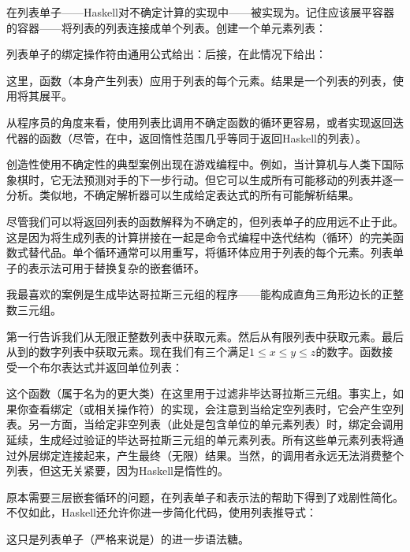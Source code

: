 在列表单子——Haskell对不确定计算的实现中——被实现为。记住应该展平容器的容器——将列表的列表连接成单个列表。创建一个单元素列表：

列表单子的绑定操作符由通用公式给出：后接，在此情况下给出：

这里，函数（本身产生列表）应用于列表的每个元素。结果是一个列表的列表，使用将其展平。

从程序员的角度来看，使用列表比调用不确定函数的循环更容易，或者实现返回迭代器的函数（尽管，在中，返回惰性范围几乎等同于返回Haskell的列表）。

创造性使用不确定性的典型案例出现在游戏编程中。例如，当计算机与人类下国际象棋时，它无法预测对手的下一步行动。但它可以生成所有可能移动的列表并逐一分析。类似地，不确定解析器可以生成给定表达式的所有可能解析结果。

尽管我们可以将返回列表的函数解释为不确定的，但列表单子的应用远不止于此。这是因为将生成列表的计算拼接在一起是命令式编程中迭代结构（循环）的完美函数式替代品。单个循环通常可以用重写，将循环体应用于列表的每个元素。列表单子的表示法可用于替换复杂的嵌套循环。

我最喜欢的案例是生成毕达哥拉斯三元组的程序——能构成直角三角形边长的正整数三元组。

第一行告诉我们从无限正整数列表\code{{[}1..{]}}中获取元素。然后从有限列表\code{{[}1..z{]}}中获取元素。最后从到的数字列表中获取元素。现在我们有三个满足$1 \leqslant x \leqslant y \leqslant z$的数字。函数接受一个布尔表达式并返回单位列表：

这个函数（属于名为的更大类）在这里用于过滤非毕达哥拉斯三元组。事实上，如果你查看绑定（或相关操作符\code{>>}）的实现，会注意到当给定空列表时，它会产生空列表。另一方面，当给定非空列表（此处是包含单位的单元素列表\code{{[}(){]}}）时，绑定会调用延续，生成经过验证的毕达哥拉斯三元组的单元素列表。所有这些单元素列表将通过外层绑定连接起来，产生最终（无限）结果。当然，的调用者永远无法消费整个列表，但这无关紧要，因为Haskell是惰性的。

原本需要三层嵌套循环的问题，在列表单子和表示法的帮助下得到了戏剧性简化。不仅如此，Haskell还允许你进一步简化代码，使用列表推导式：

这只是列表单子（严格来说是）的进一步语法糖。

